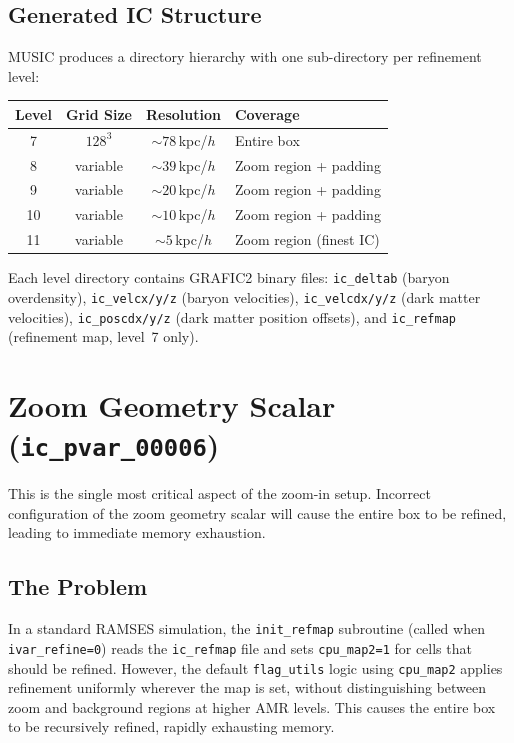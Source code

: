 \documentclass[11pt,fleqn]{book}
\begin{document}
\subsection{Generated IC Structure}

MUSIC produces a directory hierarchy with one sub-directory per refinement level:

\begin{center}
\begin{tabular}{cccl}
\toprule
\textbf{Level} & \textbf{Grid Size} & \textbf{Resolution} & \textbf{Coverage} \\
\midrule
7 & $128^3$ & ${\sim}78$\,kpc/$h$ & Entire box \\
8 & variable & ${\sim}39$\,kpc/$h$ & Zoom region + padding \\
9 & variable & ${\sim}20$\,kpc/$h$ & Zoom region + padding \\
10 & variable & ${\sim}10$\,kpc/$h$ & Zoom region + padding \\
11 & variable & ${\sim}5$\,kpc/$h$ & Zoom region (finest IC) \\
\bottomrule
\end{tabular}
\end{center}

Each level directory contains GRAFIC2 binary files: \texttt{ic\_deltab} (baryon overdensity), \texttt{ic\_velcx/y/z} (baryon velocities), \texttt{ic\_velcdx/y/z} (dark matter velocities), \texttt{ic\_poscdx/y/z} (dark matter position offsets), and \texttt{ic\_refmap} (refinement map, level~7 only).


\section{Zoom Geometry Scalar (\texttt{ic\_pvar\_00006})}

\begin{important}
This is the single most critical aspect of the zoom-in setup. Incorrect configuration of the zoom geometry scalar will cause the entire box to be refined, leading to immediate memory exhaustion.
\end{important}

\subsection{The Problem}

In a standard RAMSES simulation, the \texttt{init\_refmap} subroutine (called when \texttt{ivar\_refine=0}) reads the \texttt{ic\_refmap} file and sets \texttt{cpu\_map2=1} for cells that should be refined. However, the default \texttt{flag\_utils} logic using \texttt{cpu\_map2} applies refinement uniformly wherever the map is set, without distinguishing between zoom and background regions at higher AMR levels. This causes the entire box to be recursively refined, rapidly exhausting memory.
\end{document}

